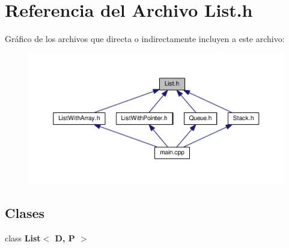 \section{Referencia del Archivo List.\-h}
\label{_list_8h}
Gráfico de los archivos que directa o indirectamente incluyen a este archivo\-:\nopagebreak
\begin{figure}[H]
\begin{center}
\leavevmode
\includegraphics[width=350pt]{_list_8h__dep__incl}
\end{center}
\end{figure}
\subsection*{Clases}
\begin{DoxyCompactItemize}
\item 
class {\bf List$<$ D, P $>$}
\end{DoxyCompactItemize}
